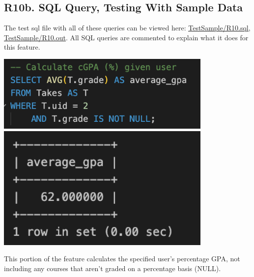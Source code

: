 \documentclass[12pt, a4paper]{article}
\begin{document}
\subsection*{R10b. SQL Query, Testing With Sample Data}
The test sql file with all of these queries can be viewed here: \underline{\href{https://github.com/Kggupta/DegreeMap/tree/main/Database/Queries/TestSample}{TestSample/R10.sql}}, \underline{\href{https://github.com/Kggupta/DegreeMap/tree/main/Database/Queries/TestSample}{TestSample/R10.out}}. All SQL queries are commented to explain what it does for this feature.
\begin{center}
    \includegraphics[width=400px]{R10/q1}
    \includegraphics[width=400px]{R10/q1out}
\end{center}
This portion of the feature calculates the specified user's percentage GPA, not including any courses that aren't graded on a percentage basis (NULL).
\end{document}
